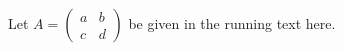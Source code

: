 \documentclass[12pt]{article}
\begin{document}
Let $A = \begin{pmatrix} a & b \\ c & d \end{pmatrix}$ be given in the running text here.
\end{document}
